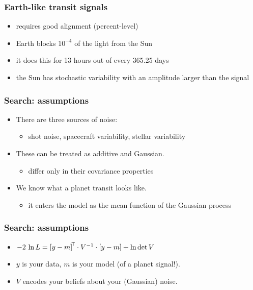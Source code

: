 \documentclass[pdftex]{beamer}
\begin{document}
\begin{frame}
  \frametitle{Earth-like transit signals}
  \begin{itemize}
  \item requires good alignment (percent-level)
  \item Earth blocks $10^{-4}$ of the light from the Sun
  \item it does this for 13 hours out of every 365.25 days
  \item the Sun has stochastic variability with an amplitude larger than the signal
  \end{itemize}
\end{frame}


\begin{frame}
  \frametitle{Search: assumptions}
  \begin{itemize}
  \item There are three sources of noise:
    \begin{itemize}
    \item shot noise, spacecraft variability, stellar variability
    \end{itemize}
  \item These can be treated as additive and Gaussian.
    \begin{itemize}
    \item differ only in their covariance properties
    \end{itemize}
  \item We know what a planet transit looks like.
    \begin{itemize}
    \item it enters the model as the mean function of the Gaussian process
    \end{itemize}
  \end{itemize}
\end{frame}

\begin{frame}
  \frametitle{Search: assumptions}
  \begin{itemize}
  \item $-2\,\ln L = {[y - m]}^{\mathsf{\!T}}\cdot V^{-1}\cdot [y - m] + \ln\det V$
  \item $y$ is your data, $m$ is your model (of a planet signal!).
  \item $V$ encodes your beliefs about your (Gaussian) noise.
  \end{itemize}
\end{frame}
\end{document}
